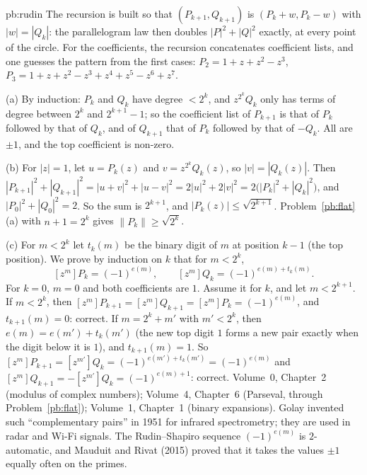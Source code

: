 \begin{solution}{pb:rudin}
\idea The recursion is built so that $(P_{k+1},Q_{k+1})$ is $(P_k+w,P_k-w)$ with $|w|=|Q_k|$: the parallelogram law then
doubles $|P|^2+|Q|^2$ exactly, at every point of the circle. For the coefficients, the recursion concatenates coefficient lists,
and one guesses the pattern from the first cases: $P_2=1+z+z^2-z^3$, $P_3=1+z+z^2-z^3+z^4+z^5-z^6+z^7$.

\writeup (a) By induction: $P_k$ and $Q_k$ have degree $<2^k$, and $z^{2^k}Q_k$ only has terms of degree between $2^k$ and
$2^{k+1}-1$; so the coefficient list of $P_{k+1}$ is that of $P_k$ followed by that of $Q_k$, and of $Q_{k+1}$ that of $P_k$
followed by that of $-Q_k$. All are $\pm1$, and the top coefficient is non-zero.

(b) For $|z|=1$, let $u=P_k(z)$ and $v=z^{2^k}Q_k(z)$, so $|v|=|Q_k(z)|$. Then $|P_{k+1}|^2+|Q_{k+1}|^2=|u+v|^2+|u-v|^2
=2|u|^2+2|v|^2=2\bigl(|P_k|^2+|Q_k|^2\bigr)$, and $|P_0|^2+|Q_0|^2=2$. So the sum is $2^{k+1}$, and $|P_k(z)|\le\sqrt{2^{k+1}}$.
Problem~\ref{pb:flat}(a) with $n+1=2^k$ gives $\|P_k\|\ge\sqrt{2^k}$.

(c) For $m<2^k$ let $t_k(m)$ be the binary digit of $m$ at position $k-1$ (the top position). We prove by induction on $k$
that for $m<2^k$,
\[
[z^m]P_k=(-1)^{e(m)},\qquad[z^m]Q_k=(-1)^{e(m)+t_k(m)}.
\]
For $k=0$, $m=0$ and both coefficients are $1$. Assume it for $k$, and let $m<2^{k+1}$. If $m<2^k$, then $[z^m]P_{k+1}=
[z^m]Q_{k+1}=[z^m]P_k=(-1)^{e(m)}$, and $t_{k+1}(m)=0$: correct. If $m=2^k+m'$ with $m'<2^k$, then $e(m)=e(m')+t_k(m')$ (the new
top digit $1$ forms a new pair exactly when the digit below it is $1$), and $t_{k+1}(m)=1$. So
$[z^m]P_{k+1}=[z^{m'}]Q_k=(-1)^{e(m')+t_k(m')}=(-1)^{e(m)}$ and $[z^m]Q_{k+1}=-[z^{m'}]Q_k=(-1)^{e(m)+1}$: correct.
\tools Volume~0, Chapter~2 (modulus of complex numbers); Volume~4, Chapter~6 (Parseval, through Problem~\ref{pb:flat});
Volume~1, Chapter~1 (binary expansions).
\leads Golay invented such ``complementary pairs'' in 1951 for infrared spectrometry; they are used in radar and Wi-Fi
signals. The Rudin--Shapiro sequence $(-1)^{e(m)}$ is $2$-automatic, and Mauduit and Rivat (2015) proved that it takes the
values $\pm1$ equally often on the primes.
\end{solution}

